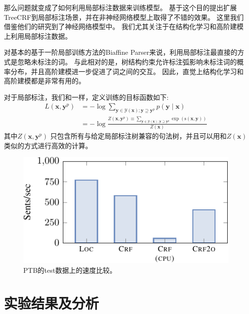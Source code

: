 那么问题就变成了如何利用局部标注数据来训练模型。
\citet{li-etal-2016-active}基于这个目的提出扩展TreeCRF到局部标注场景，并在非神经网络模型上取得了不错的效果。
这里我们借鉴他们的研究到了神经网络模型中。
我们尤其关注于在结构化学习和高阶建模上利用局部标注数据。

对基本的基于一阶局部训练方法的Biaffine Parser来说，利用局部标注最直接的方式是忽略未标注的词。
与此相对的是，树结构约束允许标注弧影响未标注词的概率分布，并且高阶建模进一步促进了词之间的交互。
因此，直觉上结构化学习和高阶建模都是非常有用的。

对于局部标注，我们和\citet{li-etal-2016-active}一样，定义训练的目标函数如下:
\begin{equation}
	\label{eq:training-loss-treecrf-partial}
	\begin{split}
		\mathit{L}(\boldsymbol{x}, {\boldsymbol{y}^p}) &= -\log \sum\limits_{\boldsymbol{y} \in \mathcal{Y}(\boldsymbol{x}); \boldsymbol{y} \supseteq {\boldsymbol{y}^p}} p(\boldsymbol{y}\mid\boldsymbol{x})  \\
		&= - \log \frac{Z(\boldsymbol{x}, {\boldsymbol{y}^p}) \equiv \sum\limits_{\boldsymbol{y} \in \mathcal{Y}(\boldsymbol{x}); \boldsymbol{y} \supseteq \boldsymbol{y}^p} \exp(\mathrm{s}(\boldsymbol{x},\boldsymbol{y}))}{Z(\boldsymbol{x})}
	\end{split}
\end{equation}
其中$Z(\boldsymbol{x}, {\boldsymbol{y}^p})$ 只包含所有与给定局部标注树兼容的句法树，并且可以用和$Z(\boldsymbol{x})$类似的方式进行高效的计算。

\begin{figure}[tb]
	\centering
	\includegraphics[scale=1.2]{figures/dep-speed.pdf}
	\caption{
		PTB的test数据上的速度比较。
	}
	\label{fig:speed}
\end{figure}

\section{实验结果及分析}\label{sec:dep-exps}

